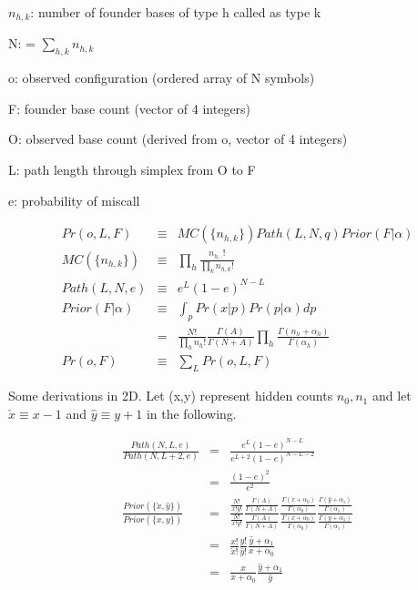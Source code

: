 \documentclass{article}
\begin{document}
$n_{h,k}$: number of founder bases of type h called as type k

N: = $\sum_{h,k}{n_{h,k}}$

o: observed configuration (ordered array of N symbols)

F: founder base count (vector of 4 integers)

O: observed base count (derived from o, vector of 4 integers)

L: path length through simplex from O to F

e: probability of miscall

\begin{eqnarray}
Pr(o, L, F) & \equiv & MC(\{n_{h,k}\}) Path(L, N, q) Prior(F|\alpha) \\[6ex]
MC(\{n_{h,k}\}) & \equiv & \prod_h \frac{n_{h,\cdot}!}{\prod_k n_{h,k}!} \\[6ex]
Path(L, N, e) & \equiv & e^L (1-e)^{N-L} \\[6ex]
Prior(F|\alpha) & \equiv & \int_p{Pr(x|p)Pr(p|\alpha)dp} \nonumber \\
& = & \frac{N!}{\prod_h n_h!} 
\frac{\Gamma(A)}{\Gamma(N+A)}
\prod_h \frac{\Gamma(n_h+\alpha_h)}{\Gamma(\alpha_h)} \\[6ex]
Pr(o,F) & \equiv & \sum_L Pr(o,L,F)
\end{eqnarray}

Some derivations in 2D.  Let (x,y) represent hidden counts ${n_0,n_1}$
and let $\check{x} \equiv x-1$ and $\hat{y} \equiv y+1$ in the
following.

\begin{eqnarray}
  \frac{Path(N,L,e)}{Path(N,L+2,e)}
  & = & \frac{e^L(1-e)^{N-L}}{e^{L+2}(1-e)^{N-L-2}} \nonumber \\
  & = & \frac{(1-e)^2}{e^2} \\[4ex]
  \frac{Prior(\{\check{x},\hat{y}\})}{Prior(\{x,y\})}
  & = &
    \frac{\frac{N!}{\check{x}!\hat{y}!}}{\frac{N!}{x!y!}}
    \frac{\frac{\Gamma(A)}{\Gamma(N+A)}}{\frac{\Gamma(A)}{\Gamma(N+A)}}
    \frac{
      \frac{\Gamma(\check{x}+\alpha_0)}{\Gamma(\alpha_0)}
    }{
      \frac{\Gamma(x+\alpha_0)}{\Gamma(\alpha_0)}
    }
    \frac{
      \frac{\Gamma(\hat{y}+\alpha_1)}{\Gamma(\alpha_1)}
    }{
      \frac{\Gamma(y+\alpha_1)}{\Gamma(\alpha_1)}
    } \nonumber \\[2ex]
    & = &
    \frac{x!}{\check{x}!}
    \frac{y!}{\hat{y}!}
    \frac{\hat{y}+\alpha_1}{x+\alpha_0} \nonumber \\
    & = &
    \frac{x}{x+\alpha_0}
    \frac{\hat{y}+\alpha_1}{\hat{y}}
\end{eqnarray}
\end{document}
